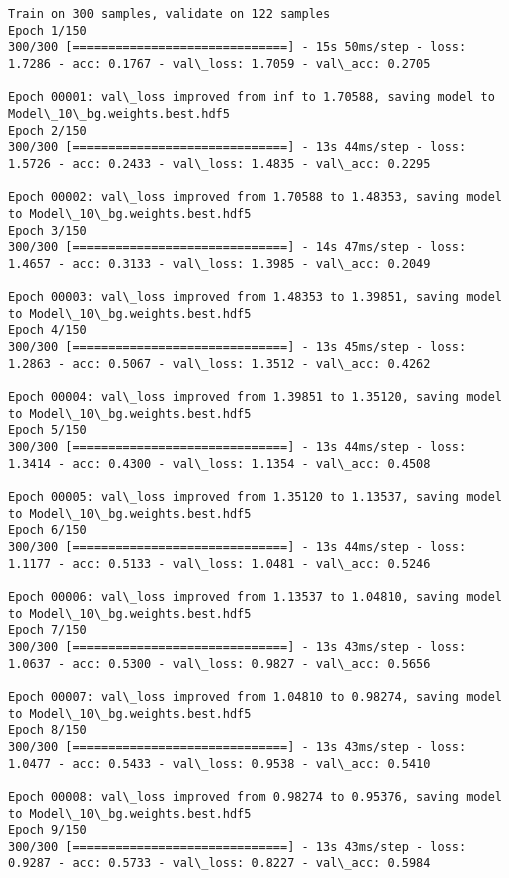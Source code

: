 \documentclass[11pt]{article}
\begin{document}
    \begin{Verbatim}[commandchars=\\\{\}]
Train on 300 samples, validate on 122 samples
Epoch 1/150
300/300 [==============================] - 15s 50ms/step - loss: 1.7286 - acc: 0.1767 - val\_loss: 1.7059 - val\_acc: 0.2705

Epoch 00001: val\_loss improved from inf to 1.70588, saving model to Model\_10\_bg.weights.best.hdf5
Epoch 2/150
300/300 [==============================] - 13s 44ms/step - loss: 1.5726 - acc: 0.2433 - val\_loss: 1.4835 - val\_acc: 0.2295

Epoch 00002: val\_loss improved from 1.70588 to 1.48353, saving model to Model\_10\_bg.weights.best.hdf5
Epoch 3/150
300/300 [==============================] - 14s 47ms/step - loss: 1.4657 - acc: 0.3133 - val\_loss: 1.3985 - val\_acc: 0.2049

Epoch 00003: val\_loss improved from 1.48353 to 1.39851, saving model to Model\_10\_bg.weights.best.hdf5
Epoch 4/150
300/300 [==============================] - 13s 45ms/step - loss: 1.2863 - acc: 0.5067 - val\_loss: 1.3512 - val\_acc: 0.4262

Epoch 00004: val\_loss improved from 1.39851 to 1.35120, saving model to Model\_10\_bg.weights.best.hdf5
Epoch 5/150
300/300 [==============================] - 13s 44ms/step - loss: 1.3414 - acc: 0.4300 - val\_loss: 1.1354 - val\_acc: 0.4508

Epoch 00005: val\_loss improved from 1.35120 to 1.13537, saving model to Model\_10\_bg.weights.best.hdf5
Epoch 6/150
300/300 [==============================] - 13s 44ms/step - loss: 1.1177 - acc: 0.5133 - val\_loss: 1.0481 - val\_acc: 0.5246

Epoch 00006: val\_loss improved from 1.13537 to 1.04810, saving model to Model\_10\_bg.weights.best.hdf5
Epoch 7/150
300/300 [==============================] - 13s 43ms/step - loss: 1.0637 - acc: 0.5300 - val\_loss: 0.9827 - val\_acc: 0.5656

Epoch 00007: val\_loss improved from 1.04810 to 0.98274, saving model to Model\_10\_bg.weights.best.hdf5
Epoch 8/150
300/300 [==============================] - 13s 43ms/step - loss: 1.0477 - acc: 0.5433 - val\_loss: 0.9538 - val\_acc: 0.5410

Epoch 00008: val\_loss improved from 0.98274 to 0.95376, saving model to Model\_10\_bg.weights.best.hdf5
Epoch 9/150
300/300 [==============================] - 13s 43ms/step - loss: 0.9287 - acc: 0.5733 - val\_loss: 0.8227 - val\_acc: 0.5984


\end{Verbatim}
\end{document}
